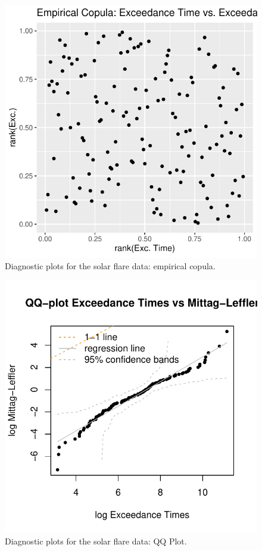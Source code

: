 \documentclass[]{elsarticle} %
\begin{document}
\begin{figure}

{\centering \includegraphics[width=0.7\linewidth]{article_springer_files/figure-latex/flare-diagnostics-2-1} 

}

\caption{\label{fig:flare-diagnostics-2} Diagnostic plots for the solar flare data: empirical copula.}\label{fig:flare-diagnostics-2}
\end{figure}

\begin{figure}

{\centering \includegraphics[width=0.7\linewidth]{article_springer_files/figure-latex/flare-diagnostics-3-1} 

}

\caption{\label{fig:flare-diagnostics-3} Diagnostic plots for the solar flare data: QQ Plot.}\label{fig:flare-diagnostics-3}
\end{figure}
\end{document}
